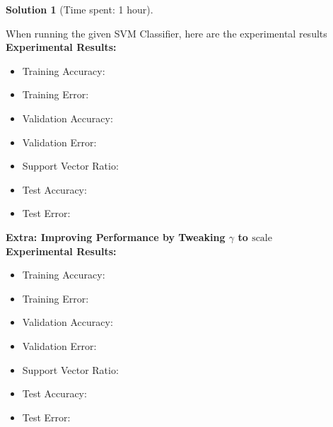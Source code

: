 \documentclass[11pt, reqno, letterpaper, twoside]{amsart}
\theoremstyle{plain}
\theoremstyle{definition}
\newtheorem{solution}[theorem]{Solution}
\begin{document}
\begin{solution}[Time spent: 1 hour]
\begin{enumerate}
    When running the given SVM Classifier, here are the experimental results \\
    \textbf{Experimental Results:}
    \begin{itemize}
        \item Training Accuracy: 
        \item Training Error: 
        \item Validation Accuracy: 
        \item Validation Error: 
        \item Support Vector Ratio: 
        \item Test Accuracy: 
        \item Test Error: 
    \end{itemize}




\noindent \textbf{Extra: Improving Performance by Tweaking $\gamma$ to $\text{scale}$} \\
\textbf{Experimental Results:}
    \begin{itemize}
        \item Training Accuracy: 
        \item Training Error: 
        \item Validation Accuracy: 
        \item Validation Error: 
        \item Support Vector Ratio: 
        \item Test Accuracy: 
        \item Test Error: 
    \end{itemize}


\end{enumerate}
\end{solution}
\end{document}

